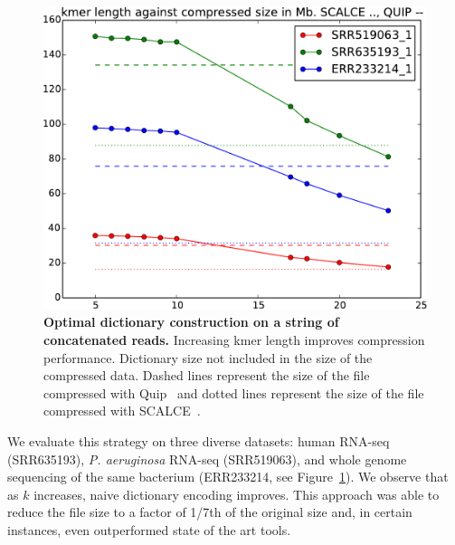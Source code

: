 \documentclass[12pt]{cmuthesis}
\begin{document}




  \begin{figure}[ht]
    \centering
    \includegraphics[width=0.7\linewidth]{figures/vary-k-fullfile-singleline}
    \caption{\textbf{Optimal dictionary construction on a string of concatenated reads.} Increasing kmer length improves compression performance. Dictionary size not included in the size of the compressed data. Dashed lines represent the size of the file compressed with Quip~\cite{Jones2012} and dotted lines represent the size of the file compressed with SCALCE~\cite{Sahinalp2012}.}
    \label{fig:denovocompr:varyK}
  \end{figure}

  We evaluate this strategy on three diverse datasets: human RNA-seq (SRR635193), \textit{P. aeruginosa} RNA-seq (SRR519063), and whole genome sequencing of the same bacterium (ERR233214, see Figure~\ref{fig:denovocompr:varyK}). We observe that as $k$ increases, naive dictionary encoding improves. This approach was able to reduce the file size to a factor of 1/7th of the original size and, in certain instances, even outperformed state of the art tools.

\end{document}
